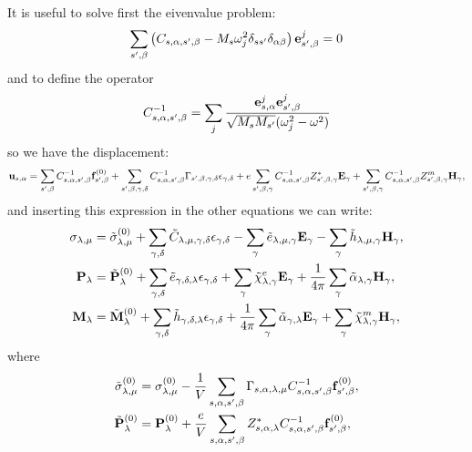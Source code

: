 \documentclass[12pt,a4paper]{article}
\begin{document}
{It is useful to solve first the eivenvalue problem:
\begin{equation}
\sum_{s',\beta} \left(C_{s,\alpha,s',\beta} - 
M_s \omega_j^2 \delta_{ss'}\delta_{\alpha\beta}\right){\bf e}^j_{s',\beta}=0
\end{equation}
and to define the operator
\begin{equation}
C^{-1}_{s,\alpha,s',\beta} = \sum_j {{\bf e}^j_{s,\alpha} {\bf e}^j_{s',\beta}
\over \sqrt{M_s M_{s'}}(\omega^2_j - \omega^2)}
\end{equation}
so we have the displacement:
\begin{equation}
{\bf u}_{s,\alpha}=\sum_{s',\beta} C^{-1}_{s,\alpha,s',\beta}
{\bf f}^{(0)}_{s',\beta} + \sum_{s',\beta,\gamma,\delta} 
C^{-1}_{s,\alpha,s',\beta}
\Gamma_{s',\beta,\gamma,\delta} \epsilon_{\gamma,\delta}
+ e \sum_{s',\beta,\gamma} C^{-1}_{s,\alpha,s',\beta}
Z^*_{s',\beta,\gamma} {\bf E}_{\gamma} 
+ \sum_{s',\beta,\gamma} C^{-1}_{s,\alpha,s',\beta} Z^m_{s',\beta,\gamma} 
{\bf H}_{\gamma},
\end{equation}
and inserting this expression in the other equations we can write:
\begin{align}
\sigma_{\lambda,\mu}&= \tilde \sigma_{\lambda,\mu}^{(0)}
+\sum_{\gamma,\delta} \tilde C_{\lambda,\mu,\gamma,\delta}  
\epsilon_{\gamma,\delta} -
\sum_{\gamma} \tilde e_{\lambda,\mu,\gamma} 
 {\bf E}_{\gamma}
-\sum_{\gamma}  \tilde h_{\lambda,\mu,\gamma} 
{\bf H}_{\gamma}, \\
{\bf P}_{\lambda}&= \tilde {\bf P}^{(0)}_{\lambda}
+\sum_{\gamma,\delta} \tilde e_{\gamma,\delta,\lambda} 
\epsilon_{\gamma,\delta} +
\sum_{\gamma} 
\tilde \chi^e_{\lambda,\gamma}
{\bf E}_{\gamma} +
{1\over 4 \pi}\sum_{\gamma} \tilde \alpha_{\lambda,\gamma} 
{\bf H}_{\gamma}, \\
{\bf M}_{\lambda}&= \tilde {\bf M}^{(0)}_{\lambda}
+\sum_{\gamma,\delta}  \tilde h_{\gamma,\delta,\lambda} 
\epsilon_{\gamma,\delta} 
+{1\over 4 \pi} \sum_{\gamma} \tilde \alpha_{\gamma,\lambda} {\bf E}_{\gamma}
+\sum_{\gamma} 
\tilde \chi^m_{\lambda,\gamma}
{\bf H}_{\gamma},
\end{align}
where 
\begin{align}
\tilde \sigma^{(0)}_{\lambda,\mu}&= \sigma^{(0)}_{\lambda,\mu}
-{1\over V} \sum_{s,\alpha,s',\beta} \Gamma_{s,\alpha,\lambda,\mu}
C^{-1}_{s,\alpha,s',\beta} {\bf f}^{(0)}_{s',\beta}, \\
\tilde {\bf P}^{(0)}_\lambda&= {\bf P}^{(0)}_\lambda +{e\over V}
\sum_{s,\alpha,s',\beta} Z^*_{s,\alpha,\lambda} C^{-1}_{s,\alpha,s',\beta}
{\bf f}^{(0)}_{s',\beta}, \\

\end{align}}
\end{document}
